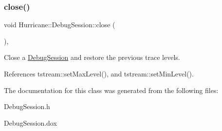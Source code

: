 \subsubsection{\texorpdfstring{close()}{close()}}
{\footnotesize\ttfamily void Hurricane\+::\+Debug\+Session\+::close (\begin{DoxyParamCaption}{ }\end{DoxyParamCaption})\hspace{0.3cm}{\ttfamily [inline]}, {\ttfamily [static]}}

Close a \hyperlink{classHurricane_1_1DebugSession}{Debug\+Session} and restore the previous trace levels. 

References tstream\+::set\+Max\+Level(), and tstream\+::set\+Min\+Level().



The documentation for this class was generated from the following files\+:\begin{DoxyCompactItemize}
\item 
Debug\+Session.\+h\item 
Debug\+Session.\+dox\end{DoxyCompactItemize}
